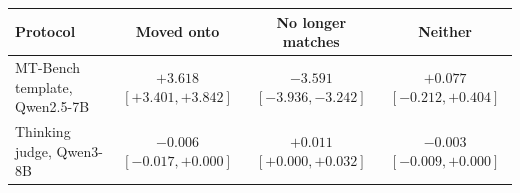 \begin{tabular}{lccc}
\toprule
Protocol & Moved onto & No longer matches & Neither \\
\midrule
MT-Bench template, Qwen2.5-7B & $+3.618$ {\scriptsize$[+3.401,+3.842]$} & $-3.591$ {\scriptsize$[-3.936,-3.242]$} & $+0.077$ {\scriptsize$[-0.212,+0.404]$} \\
Thinking judge, Qwen3-8B & $-0.006$ {\scriptsize$[-0.017,+0.000]$} & $+0.011$ {\scriptsize$[+0.000,+0.032]$} & $-0.003$ {\scriptsize$[-0.009,+0.000]$} \\
\bottomrule
\end{tabular}
